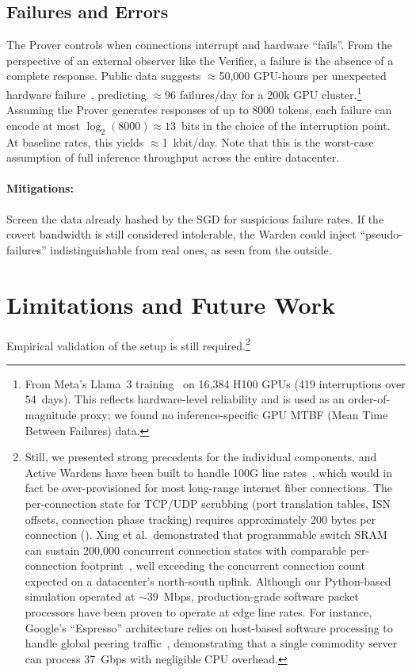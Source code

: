 \documentclass{article}
\begin{document}
\subsection{Failures and Errors}

The Prover controls when connections interrupt and hardware ``fails''. From the perspective of an external observer like the Verifier, a failure is the absence of a complete response. Public data suggests $\approx$50{,}000 GPU-hours per unexpected hardware failure~\cite{dubey2024llama3}, predicting $\approx$96 failures/day for a 200k GPU cluster.\footnote{From Meta's Llama~3 training~\cite{dubey2024llama3} on 16{,}384 H100 GPUs (419 interruptions over 54~days). This reflects hardware-level reliability and is used as an order-of-magnitude proxy; we found no inference-specific GPU MTBF (Mean Time Between Failures) data.} Assuming the Prover generates responses of up to 8000 tokens, each failure can encode at most $\log_2(8000) \approx 13$~bits in the choice of the interruption point. At baseline rates, this yields $\approx$1~kbit/day. Note that this is the worst-case assumption of full inference throughput across the entire datacenter.

\paragraph{Mitigations:} Screen the data already hashed by the SGD for suspicious failure rates. If the covert bandwidth is still considered intolerable, the Warden could inject ``pseudo-failures'' indistinguishable from real ones, as seen from the outside.

\section{Limitations and Future Work}
\label{sec:limitations}

Empirical validation of the setup is still required.\footnote{Still, we presented strong precedents for the individual components, and Active Wardens have been built to handle 100G line rates~\cite{xing2020netwarden}, which would in fact be over-provisioned for most long-range internet fiber connections. The per-connection state for TCP/UDP scrubbing (port translation tables, ISN offsets, connection phase tracking) requires approximately 200 bytes per connection (). Xing et al.\ demonstrated that programmable switch SRAM can sustain 200{,}000 concurrent connection states with comparable per-connection footprint~\cite{xing2020netwarden}, well exceeding the concurrent connection count expected on a datacenter's north-south uplink. Although our Python-based simulation operated at $\sim$39~Mbps, production-grade software packet processors have been proven to operate at edge line rates. For instance, Google's ``Espresso'' architecture relies on host-based software processing to handle global peering traffic~\cite{yap2017espresso}, demonstrating that a single commodity server can process 37~Gbps with negligible CPU overhead.}
\end{document}
